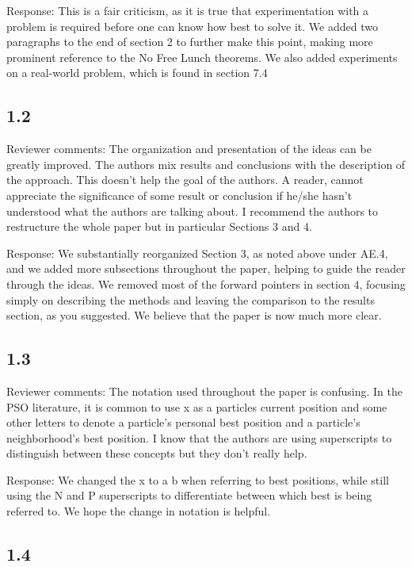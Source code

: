 \documentclass[onecolumn, 12pt]{article}
\begin{document}
Response: This is a fair criticism, as it is true that experimentation with a
problem is required before one can know how best to solve it.  We added two
paragraphs to the end of section 2 to further make this point, making more
prominent reference to the No Free Lunch theorems.  We also added experiments
on a real-world problem, which is found in section 7.4

\subsection*{1.2}

Reviewer comments: The organization and presentation of the ideas can be
greatly improved. The authors mix results and conclusions with the description
of the approach. This doesn't help the goal of the authors. A reader, cannot
appreciate the significance of some result or conclusion if he/she hasn't
understood what the authors are talking about. I recommend the authors to
restructure the whole paper but in particular Sections 3 and 4.

Response: We substantially reorganized Section 3, as noted above under AE.4,
and we added more subsections throughout the paper, helping to guide the reader
through the ideas.  We removed most of the forward pointers in section 4,
focusing simply on describing the methods and leaving the comparison to the
results section, as you suggested.  We believe that the paper is now much more
clear.

\subsection*{1.3}

Reviewer comments: The notation used throughout the paper is confusing. In the
PSO literature, it is common to use x as a particles current position and some
other letters to denote a particle's personal best position and a particle's
neighborhood's best position. I know that the authors are using superscripts to
distinguish between these concepts but they don't really help.

Response: We changed the x to a b when referring to best positions, while still
using the N and P superscripts to differentiate between which best is being
referred to.  We hope the change in notation is helpful.

\subsection*{1.4}
\end{document}
